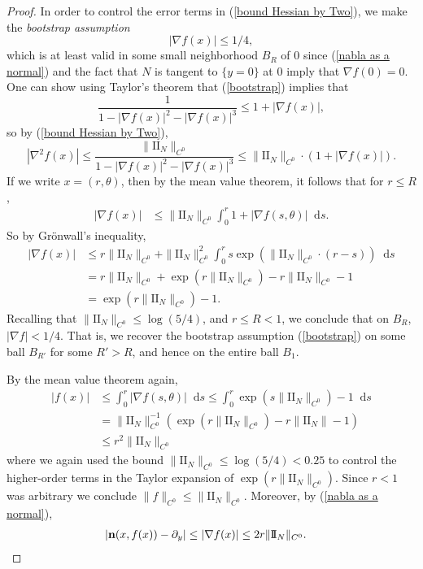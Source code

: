 \documentclass[reqno,11pt]{amsart}
\newcommand*\dif{\mathop{}\!\mathrm{d}}
\newcommand{\Two}{\mathrm{I\!I}}
\newcommand{\normal}{\mathbf n}
\newcommand{\dfn}[1]{\emph{#1}\index{#1}}
\theoremstyle{definition}
\numberwithin{equation}{section}
\begin{document}
\begin{proof}
	In order to control the error terms in (\ref{bound Hessian by Two}), we make the \dfn{bootstrap assumption}
\begin{equation}\label{bootstrap}
	|\nabla f(x)| \leq 1/4,
\end{equation}
	which is at least valid in some small neighborhood $B_R$ of $0$ since (\ref{nabla as a normal}) and the fact that $N$ is tangent to $\{y = 0\}$ at $0$ imply that $\nabla f(0) = 0$.
	One can show using Taylor's theorem that (\ref{bootstrap}) implies that 
	$$\frac{1}{1 - |\nabla f(x)|^2 - |\nabla f(x)|^3} \leq 1 + |\nabla f(x)|,$$
	so by (\ref{bound Hessian by Two}),
	$$|\nabla^2 f(x)| \leq \frac{\|\Two_N\|_{C^0}}{1 - |\nabla f(x)|^2 - |\nabla f(x)|^3} \leq \|\Two_N\|_{C^0} \cdot (1 + |\nabla f(x)|).$$
	If we write $x = (r, \theta)$, then by the mean value theorem, it follows that for $r \leq R$,
\begin{align*}
	|\nabla f(x)| &\leq \|\Two_N\|_{C^0} \int_0^r 1 + |\nabla f(s, \theta)| \dif s.
\end{align*}
	So by Gr\"onwall's inequality,
\begin{align*}
	|\nabla f(x)| &\leq r \|\Two_N\|_{C^0} + \|\Two_N\|_{C^0}^2 \int_0^r s \exp(\|\Two_N\|_{C^0} \cdot (r - s)) \dif s \\
	&= r \|\Two_N\|_{C^0} + \exp(r \|\Two_N\|_{C^0}) - r \|\Two_N\|_{C^0} - 1 \\
	&= \exp(r \|\Two_N\|_{C^0}) - 1.
\end{align*}
	Recalling that $\|\Two_N\|_{C^0} \leq \log(5/4)$, and $r \leq R < 1$, we conclude that on $B_R$, $|\nabla f| < 1/4$.
	That is, we recover the bootstrap assumption (\ref{bootstrap}) on some ball $B_{R'}$ for some $R' > R$, and hence on the entire ball $B_1$.

	By the mean value theorem again,
\begin{align*}
	|f(x)| &\leq \int_0^r |\nabla f(s, \theta)| \dif s \leq \int_0^r \exp(s \|\Two_N\|_{C^0}) - 1 \dif s \\
	&= \|\Two_N\|_{C^0}^{-1} (\exp(r \|\Two_N\|_{C^0}) - r\|\Two_N\| - 1) \\
	&\leq r^2 \|\Two_N\|_{C^0}
\end{align*}
	where we again used the bound $\|\Two_N\|_{C^0} \leq \log(5/4) < 0.25$ to control the higher-order terms in the Taylor expansion of $\exp(r \|\Two_N\|_{C^0})$. Since $r < 1$ was arbitrary we conclude $\|f\|_{C^0} \leq \|\Two_N\|_{C^0}$. Moreover, by (\ref{nabla as a normal}),
\begin{align*}
	|\normal(x, f(x)) - \partial_y| &\leq |\nabla f(x)| \leq 2r \|\Two_N\|_{C^0}. \qedhere
\end{align*}
\end{proof}
\end{document}
